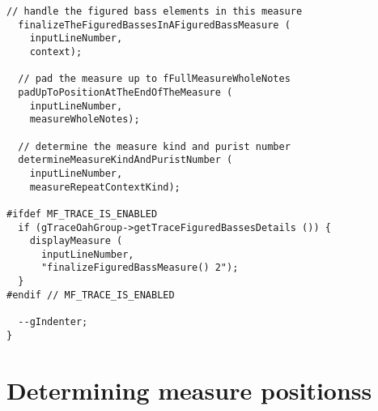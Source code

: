 \begin{lstlisting}[language=CPlusPlus]
  // handle the figured bass elements in this measure
  finalizeTheFiguredBassesInAFiguredBassMeasure (
    inputLineNumber,
    context);

  // pad the measure up to fFullMeasureWholeNotes
  padUpToPositionAtTheEndOfTheMeasure (
    inputLineNumber,
    measureWholeNotes);

  // determine the measure kind and purist number
  determineMeasureKindAndPuristNumber (
    inputLineNumber,
    measureRepeatContextKind);

#ifdef MF_TRACE_IS_ENABLED
  if (gTraceOahGroup->getTraceFiguredBassesDetails ()) {
    displayMeasure (
      inputLineNumber,
      "finalizeFiguredBassMeasure() 2");
  }
#endif // MF_TRACE_IS_ENABLED

  --gIndenter;
}
\end{lstlisting}


\section{Determining measure positionss}

